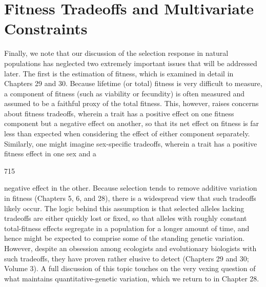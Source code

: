 \documentclass{article}
\begin{document}
\section{Fitness Tradeoffs and Multivariate Constraints}
Finally, we note that our discussion of the selection response in natural populations has neglected two extremely important issues that will be addressed later. The first is the estimation of fitness, which is examined in detail in Chapters 29 and 30. Because lifetime (or total) fitness is very difficult to measure, a component of fitness (such as viability or fecundity) is often measured and assumed to be a faithful proxy of the total fitness. This, however, raises concerns about fitness tradeoffs, wherein a trait has a positive effect on one fitness component but a negative effect on another, so that its net effect on fitness is far less than expected when considering the effect of either component separately. Similarly, one might imagine sex-specific tradeoffs, wherein a trait has a positive fitness effect in one sex and a

715

negative effect in the other. Because selection tends to remove additive variation in fitness (Chapters 5, 6, and 28), there is a widespread view that such tradeoffs likely occur. The logic behind this assumption is that selected alleles lacking tradeoffs are either quickly lost or fixed, so that alleles with roughly constant total-fitness effects segregate in a population for a longer amount of time, and hence might be expected to comprise some of the standing genetic variation. However, despite an obsession among ecologists and evolutionary biologists with such tradeoffs, they have proven rather elusive to detect (Chapters 29 and 30; Volume 3). A full discussion of this topic touches on the very vexing question of what maintains quantitative-genetic variation, which we return to in Chapter 28.
\end{document}
